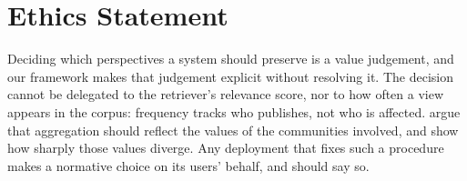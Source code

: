 \section*{Ethics Statement}
\label{sec:ethics}

Deciding which perspectives a system should preserve is a value judgement, and our framework makes that judgement explicit without resolving it. The decision cannot be delegated to the retriever's relevance score, nor to how often a view appears in the corpus: frequency tracks who publishes, not who is affected. \citet{pmlr-v235-conitzer24a} argue that aggregation should reflect the values of the communities involved, and \citet{awad2018moral} show how sharply those values diverge. Any deployment that fixes such a procedure makes a normative choice on its users' behalf, and should say so.